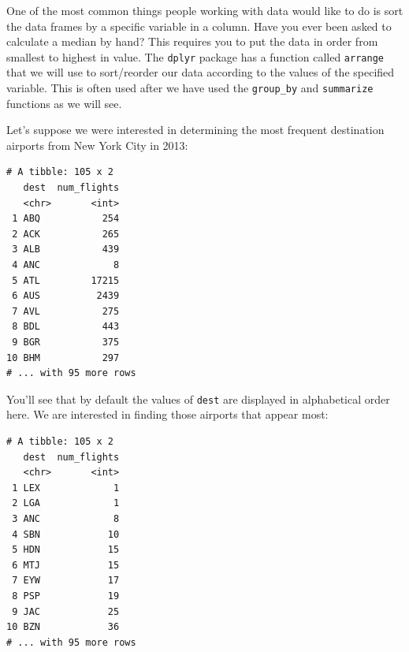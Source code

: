 \documentclass[12pt,]{krantz}
\makeatletter
\newenvironment{Shaded}{\begin{snugshade}}{\end{snugshade}}
\newcommand{\KeywordTok}[1]{\textcolor[rgb]{0.27,0.27,0.27}{\textbf{#1}}}
\newcommand{\DataTypeTok}[1]{\textcolor[rgb]{0.27,0.27,0.27}{#1}}
\newcommand{\StringTok}[1]{\textcolor[rgb]{0.5,0.5,0.5}{#1}}
\newcommand{\OperatorTok}[1]{\textcolor[rgb]{0.43,0.43,0.43}{\textbf{#1}}}
\newcommand{\NormalTok}[1]{#1}
\newenvironment{kframe}{%
\medskip{}
\setlength{\fboxsep}{.8em}
 \def\at@end@of@kframe{}%
 \ifinner\ifhmode%
  \def\at@end@of@kframe{\end{minipage}}%
  \begin{minipage}{\columnwidth}%
 \fi\fi%
 \def\FrameCommand##1{\hskip\@totalleftmargin \hskip-\fboxsep
 \colorbox{shadecolor}{##1}\hskip-\fboxsep
     \hskip-\linewidth \hskip-\@totalleftmargin \hskip\columnwidth}%
 \MakeFramed {\advance\hsize-\width
   \@totalleftmargin\z@ \linewidth\hsize
   \@setminipage}}%
 {\par\unskip\endMakeFramed%
 \at@end@of@kframe}
\renewenvironment{Shaded}{\begin{kframe}}{\end{kframe}}
\theoremstyle{definition}
\theoremstyle{definition}
\theoremstyle{definition}
\theoremstyle{remark}
\makeatother
\begin{document}
One of the most common things people working with data would like to do
is sort the data frames by a specific variable in a column. Have you
ever been asked to calculate a median by hand? This requires you to put
the data in order from smallest to highest in value. The \texttt{dplyr}
package has a function called \texttt{arrange} that we will use to
sort/reorder our data according to the values of the specified variable.
This is often used after we have used the \texttt{group\_by} and
\texttt{summarize} functions as we will see.

Let's suppose we were interested in determining the most frequent
destination airports from New York City in 2013:

\begin{Shaded}
\end{Shaded}

\begin{verbatim}
# A tibble: 105 x 2
   dest  num_flights
   <chr>       <int>
 1 ABQ           254
 2 ACK           265
 3 ALB           439
 4 ANC             8
 5 ATL         17215
 6 AUS          2439
 7 AVL           275
 8 BDL           443
 9 BGR           375
10 BHM           297
# ... with 95 more rows
\end{verbatim}

You'll see that by default the values of \texttt{dest} are displayed in
alphabetical order here. We are interested in finding those airports
that appear most:

\begin{Shaded}
\end{Shaded}

\begin{verbatim}
# A tibble: 105 x 2
   dest  num_flights
   <chr>       <int>
 1 LEX             1
 2 LGA             1
 3 ANC             8
 4 SBN            10
 5 HDN            15
 6 MTJ            15
 7 EYW            17
 8 PSP            19
 9 JAC            25
10 BZN            36
# ... with 95 more rows
\end{verbatim}
\end{document}
